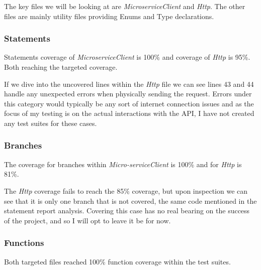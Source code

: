 The key files we will be looking at are \textit{MicroserviceClient} and \textit{Http}. The other files are mainly utility files providing Enums and Type declarations.
\subsubsection{Statements}
Statements coverage of \textit{MicroserviceClient} is 100\% and coverage of \textit{Http} is 95\%. Both reaching the targeted coverage.

If we dive into the uncovered lines within the \textit{Http} file we can see lines 43 and 44 handle any unexpected errors when physically sending the request. Errors under this category would typically be any sort of internet connection issues and as the focus of my testing is on the actual interactions with the API, I have not created any test suites for these cases.
\subsubsection{Branches}
The coverage for branches within \textit{Micro-serviceClient} is 100\% and for \textit{Http} is 81\%.

The \textit{Http} coverage fails to reach the 85\% coverage, but upon inspection we can see that it is only one branch that is not covered, the same code mentioned in the statement report analysis. Covering this case has no real bearing on the success of the project, and so I will opt to leave it be for now.
\subsubsection{Functions}
Both targeted files reached 100\% function coverage within the test suites.
